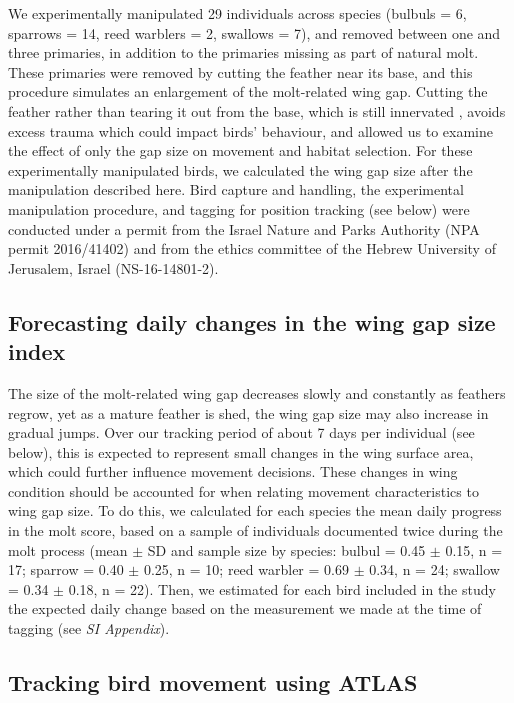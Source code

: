 \begin{refsection}
We experimentally manipulated 29 individuals across species {(bulbuls = 6, sparrows = 14, reed warblers = 2, swallows = 7)}, and removed between one and three primaries, in addition to the primaries missing as part of natural molt.
These primaries were removed by cutting the feather near its base, and this procedure simulates an enlargement of the molt-related wing gap.
Cutting the feather rather than tearing it out from the base, which is still innervated \cite{jenni2020}, avoids excess trauma which could impact birds' behaviour, and allowed us to examine the effect of only the gap size on movement and habitat selection.
For these experimentally manipulated birds, we calculated the wing gap size after the manipulation described here.
Bird capture and handling, the experimental manipulation procedure, and tagging for position tracking (see below) were conducted under a permit from the Israel Nature and Parks Authority (NPA permit 2016/41402) and from the ethics committee of the Hebrew University of Jerusalem, Israel (NS-16-14801-2).

\subsection*{Forecasting daily changes in the wing gap size index}

The size of the molt-related wing gap decreases slowly and constantly as feathers regrow, yet as a mature feather is shed, the wing gap size may also increase in gradual jumps.
Over our tracking period of about 7 days per individual (see below), this is expected to represent small changes in the wing surface area, which could further influence movement decisions.
These changes in wing condition should be accounted for when relating movement characteristics to wing gap size.
To do this, we calculated for each species the mean daily progress in the molt score, based on a sample of individuals documented twice during the molt process (mean $\pm$ SD and sample size by species: bulbul = 0.45 $\pm$ 0.15, n = 17; sparrow = 0.40 $\pm$ 0.25, n = 10; reed warbler = 0.69 $\pm$ 0.34, n = 24; swallow = 0.34 $\pm$ 0.18, n = 22). 
Then, we estimated for each bird included in the study the expected daily change based on the measurement we made at the time of tagging (see \textit{SI Appendix}).

\subsection*{Tracking bird movement using ATLAS}


\end{refsection}
